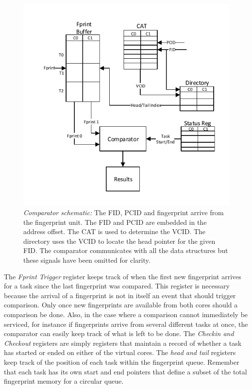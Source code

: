 \begin{figure}[ht]
\centering
\includegraphics[scale=1.5]{Figures/compsch}
\caption[Comparator schematic]{\emph{Comparator schematic:} The FID, PCID and fingerprint arrive from the fingerprint unit. The FID and PCID are embedded in the address offset. The CAT is used to determine the VCID. The directory uses the VCID to locate the head pointer for the given FID. The comparator communicates with all the data structures but these signals have been omitted for clarity.}
\label{f:comp_sch}
\end{figure}
The \emph{Fprint Trigger} register keeps track of when the first new fingerprint arrives for a task since the last fingerprint was compared. This register is necessary because the arrival of a fingerprint is not in itself an event that should trigger comparison. Only once new fingerprints are available from both cores should a comparison be done. Also, in the case where a comparison cannot immediately be serviced, for instance if fingerprints arrive from several different tasks at once, the comparator can easily keep track of what is left to be done. The \emph{Checkin and Checkout} registers are simply registers that maintain a record of whether a task has started or ended on either of the virtual cores. The \emph{head and tail} registers keep track of the position of each task within the fingerprint queue. Remember that each task has its own start and end pointers that define a subset of the total fingerprint memory for a circular queue.

